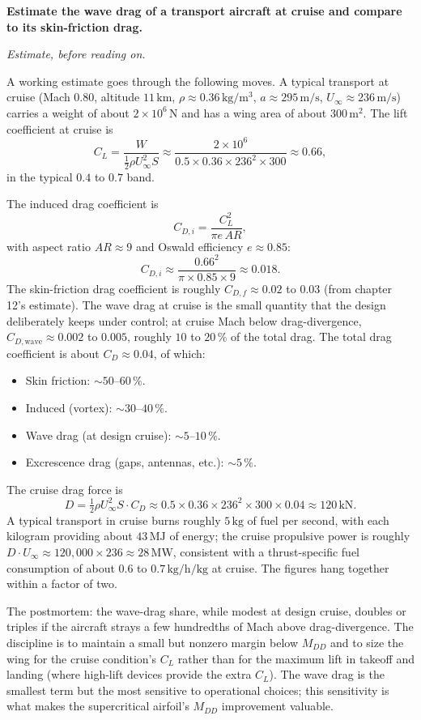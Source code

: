 \begin{estimation}
\textbf{Estimate the wave drag of a transport aircraft at cruise
and compare to its skin-friction drag.}

\smallskip
\textit{Estimate, before reading on.}

\smallskip
A working estimate goes through the following moves. A typical
transport at cruise (Mach $0.80$, altitude $11\,\si{\kilo\meter}$,
$\rho \approx 0.36\,\si{\kilogram\per\meter\cubed}$, $a \approx
295\,\si{\meter\per\second}$, $U_\infty \approx 236\,\si{\meter
\per\second}$) carries a weight of about $2\times 10^6\,\si{
\newton}$ and has a wing area of about $300\,\si{\meter}^2$. The
lift coefficient at cruise is
\[
C_L = \frac{W}{\tfrac{1}{2}\rho U_\infty^2 S} \approx \frac{2\times
10^6}{0.5\times 0.36\times 236^2\times 300} \approx 0.66,
\]
in the typical $0.4$ to $0.7$ band.

The induced drag coefficient is
\[
C_{D,i} = \frac{C_L^2}{\pi e\,AR},
\]
with aspect ratio $AR \approx 9$ and Oswald efficiency $e \approx
0.85$:
\[
C_{D,i} \approx \frac{0.66^2}{\pi\times 0.85\times 9} \approx
0.018.
\]
The skin-friction drag coefficient is roughly
$C_{D,f} \approx 0.02$ to $0.03$ (from chapter 12's estimate).
The wave drag at cruise is the small quantity that the design
deliberately keeps under control; at cruise Mach below
drag-divergence, $C_{D,\text{wave}} \approx 0.002$ to $0.005$,
roughly $10$ to $20\,\%$ of the total drag. The total drag
coefficient is about $C_D \approx 0.04$, of which:

\begin{itemize}[leftmargin=*]
  \item Skin friction: $\sim 50$--$60\,\%$.
  \item Induced (vortex): $\sim 30$--$40\,\%$.
  \item Wave drag (at design cruise): $\sim 5$--$10\,\%$.
  \item Excrescence drag (gaps, antennas, etc.): $\sim 5\,\%$.
\end{itemize}

The cruise drag force is
\[
D = \tfrac{1}{2}\rho U_\infty^2 S \cdot C_D \approx 0.5\times 0.36
\times 236^2\times 300\times 0.04 \approx 120\,\text{kN}.
\]
A typical transport in cruise burns roughly $5\,\text{kg}$ of fuel
per second, with each kilogram providing about $43\,\text{MJ}$ of
energy; the cruise propulsive power is roughly $D\cdot U_\infty
\approx 120{,}000\times 236 \approx 28\,\text{MW}$, consistent with
a thrust-specific fuel consumption of about $0.6$ to $0.7\,\text{
kg/h/kg}$ at cruise. The figures hang together within a factor of
two.

The postmortem: the wave-drag share, while modest at design
cruise, doubles or triples if the aircraft strays a few hundredths
of Mach above drag-divergence. The discipline is to maintain a
small but nonzero margin below $M_{DD}$ and to size the wing for
the cruise condition's $C_L$ rather than for the maximum lift in
takeoff and landing (where high-lift devices provide the extra
$C_L$). The wave drag is the smallest term but the most
sensitive to operational choices; this sensitivity is what makes
the supercritical airfoil's $M_{DD}$ improvement valuable.
\end{estimation}

